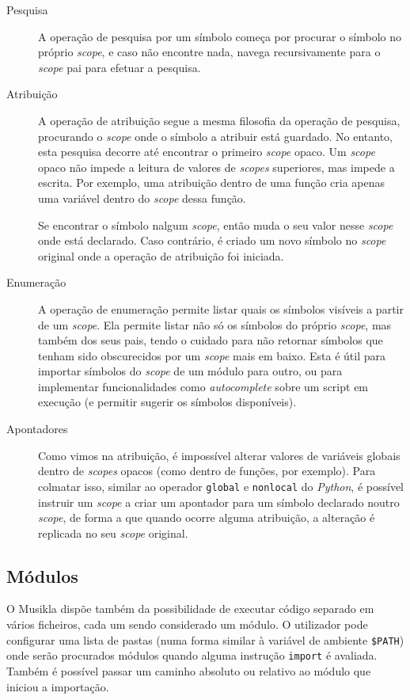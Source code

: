 \begin{description}
 \item[Pesquisa] A operação de pesquisa por um símbolo começa por procurar o símbolo no próprio \textit{scope}, e caso não encontre nada, navega recursivamente para o \textit{scope} pai para efetuar a pesquisa.
 
 \item[Atribuição] A operação de atribuição segue a mesma filosofia da operação de pesquisa, procurando o \textit{scope} onde o símbolo a atribuir está guardado. No entanto, esta pesquisa decorre até encontrar o primeiro \textit{scope} opaco. Um \textit{scope} opaco não impede a leitura de valores de \textit{scopes} superiores, mas impede a escrita. Por exemplo, uma atribuição dentro de uma função cria apenas uma variável dentro do \textit{scope} dessa função.
 
 Se encontrar o símbolo nalgum \textit{scope}, então muda o seu valor nesse \textit{scope} onde está declarado. Caso contrário, é criado um novo símbolo no \textit{scope} original onde a operação de atribuição foi iniciada.
 
 \item[Enumeração] A operação de enumeração permite listar quais os símbolos visíveis a partir de um \textit{scope}. Ela permite listar não só os símbolos do próprio \textit{scope}, mas também dos seus pais, tendo o cuidado para não retornar símbolos que tenham sido obscurecidos por um \textit{scope} mais em baixo. Esta é útil para importar símbolos do \textit{scope} de um módulo para outro, ou para implementar funcionalidades como \textit{autocomplete} sobre um script em execução (e permitir sugerir os símbolos disponíveis).
 
 \item[Apontadores] Como vimos na atribuição, é impossível alterar valores de variáveis globais dentro de \textit{scopes} opacos (como dentro de funções, por exemplo). Para colmatar isso, similar ao operador \texttt{global} e \texttt{nonlocal} do \textit{Python}, é possível instruir um \textit{scope} a criar um apontador para um símbolo declarado noutro \textit{scope}, de forma a que quando ocorre alguma atribuição, a alteração é replicada no seu \textit{scope} original.
\end{description}

\subsection{Módulos}
O Musikla dispõe também da possibilidade de executar código separado em vários ficheiros, cada um sendo considerado um módulo. O utilizador pode configurar uma lista de pastas (numa forma similar à variável de ambiente \texttt{\$PATH}) onde serão procurados módulos quando alguma instrução \texttt{import} é avaliada. Também é possível passar um caminho absoluto ou relativo ao módulo que iniciou a importação.

